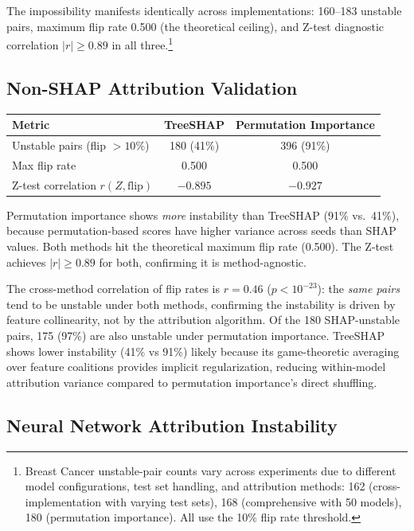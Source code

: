 \documentclass{jmlr}
\begin{document}
The impossibility manifests identically across implementations: 160--183 unstable pairs, maximum flip rate 0.500 (the theoretical ceiling), and Z-test diagnostic correlation $|r| \geq 0.89$ in all three.\footnote{Breast Cancer unstable-pair counts vary across experiments due to different model configurations, test set handling, and attribution methods: 162 (cross-implementation with varying test sets), 168 (comprehensive with 50 models), 180 (permutation importance). All use the 10\% flip rate threshold.}

\subsection{Non-SHAP Attribution Validation}

\begin{center}
\small
\begin{tabular}{@{}lcc@{}}
\toprule
Metric & TreeSHAP & Permutation Importance \\
\midrule
Unstable pairs (flip $>10\%$) & 180 (41\%) & 396 (91\%) \\
Max flip rate & 0.500 & 0.500 \\
Z-test correlation $r(Z, \text{flip})$ & $-0.895$ & $-0.927$ \\
\bottomrule
\end{tabular}
\end{center}

Permutation importance shows \emph{more} instability than TreeSHAP (91\% vs.\ 41\%), because permutation-based scores have higher variance across seeds than SHAP values. Both methods hit the theoretical maximum flip rate (0.500). The Z-test achieves $|r| \geq 0.89$ for both, confirming it is method-agnostic.

The cross-method correlation of flip rates is $r = 0.46$ ($p < 10^{-23}$): the \emph{same pairs} tend to be unstable under both methods, confirming the instability is driven by feature collinearity, not by the attribution algorithm. Of the 180 SHAP-unstable pairs, 175 (97\%) are also unstable under permutation importance. TreeSHAP shows lower instability (41\% vs 91\%) likely because its game-theoretic averaging over feature coalitions provides implicit regularization, reducing within-model attribution variance compared to permutation importance's direct shuffling.

\subsection{Neural Network Attribution Instability}
\end{document}
